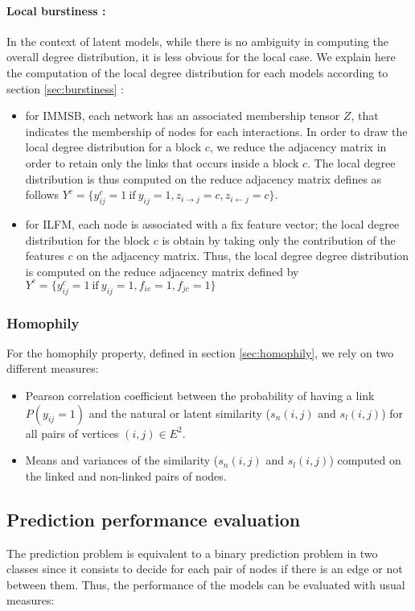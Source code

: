 \documentclass[a4paper, 12pt]{article}
\begin{document}
\paragraph{Local burstiness : }
In the context of latent models, while there is no ambiguity in computing the overall degree distribution, it is less obvious for the local case. We explain here the computation of the local degree distribution for each models according to section \ref{sec:burstiness} :
\begin{itemize}
        \item for IMMSB, each network has an associated membership tensor $Z$, that indicates the membership of nodes for each  interactions. In order to draw the local degree distribution for a block $c$, we reduce the adjacency matrix in order to retain only the links that occurs inside a block $c$. The local degree distribution is thus computed on the reduce adjacency matrix defines as follows $Y^c =\{ y_{ij}^c=1 \ \textrm{if}\ y_{ij}=1 , z_{i\rightarrow j}=c, z_{i\leftarrow j}=c\}$.
        \item for ILFM, each node is associated with a fix feature vector; the local degree distribution for the block $c$ is obtain by taking only the contribution of the features $c$ on the adjacency matrix. Thus, the local degree degree distribution is computed on the reduce adjacency matrix defined by $Y^c =\{ y_{ij}^c=1 \ \textrm{if}\ y_{ij}=1 , f_{ic}=1, f_{jc}=1\}$
\end{itemize}

\subsubsection{Homophily}

For the homophily property, defined in section \ref{sec:homophily}, we rely on two different measures:

\begin{itemize}
    \item  Pearson correlation coefficient between the probability of having a link $P(y_{ij}=1)$  and the natural or latent similarity ($s_n(i,j)$ and $s_l(i,j)$) for all pairs of vertices $(i,j) \in E^2 $. 
    \item  Means and variances of the similarity ($s_n(i,j)$ and $s_l(i,j)$) computed on the linked and non-linked pairs of nodes.
\end{itemize}

\subsection{Prediction performance evaluation}
The prediction problem is equivalent to a binary prediction problem in two classes since it consists to decide for each pair of nodes if there is an edge or not between them. 
Thus, the performance of the models can be evaluated with usual measures:
\end{document}
